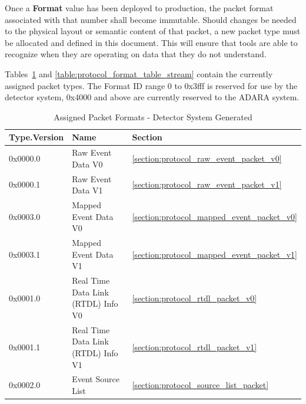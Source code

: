 Once a {\bf Format} value has been deployed to production,
the packet format associated with that number shall become immutable. Should
changes be needed to the physical layout or semantic content of that packet, a
new packet type must be allocated and defined in this document. This will
ensure that tools are able to recognize when they are operating on data that
they do not understand.

Tables~\ref{table:protocol_format_table_detector}
and \ref{table:protocol_format_table_stream}
contain the currently assigned packet types.
The Format ID range 0 to 0x3fff is reserved for use by
the detector system, 0x4000 and above are currently reserved to the ADARA
system.

\begin{table}
  \begin{center}
    \begin{tabular}{l | l | l}
	Type.Version & Name & Section \\
	\hline
	0x0000.0 & Raw Event Data V0 &
		\ref{section:protocol_raw_event_packet_v0} \\
	0x0000.1 & Raw Event Data V1 &
		\ref{section:protocol_raw_event_packet_v1} \\
	0x0003.0 & Mapped Event Data V0 &
		\ref{section:protocol_mapped_event_packet_v0} \\
	0x0003.1 & Mapped Event Data V1 &
		\ref{section:protocol_mapped_event_packet_v1} \\
	0x0001.0 & Real Time Data Link (RTDL) Info V0 &
		\ref{section:protocol_rtdl_packet_v0} \\
	0x0001.1 & Real Time Data Link (RTDL) Info V1 &
		\ref{section:protocol_rtdl_packet_v1} \\
	0x0002.0 & Event Source List &
		\ref{section:protocol_source_list_packet} \\
    \end{tabular}
  \end{center}
  \caption {Assigned Packet Formats - Detector System Generated}
  \label{table:protocol_format_table_detector}
\end{table}

